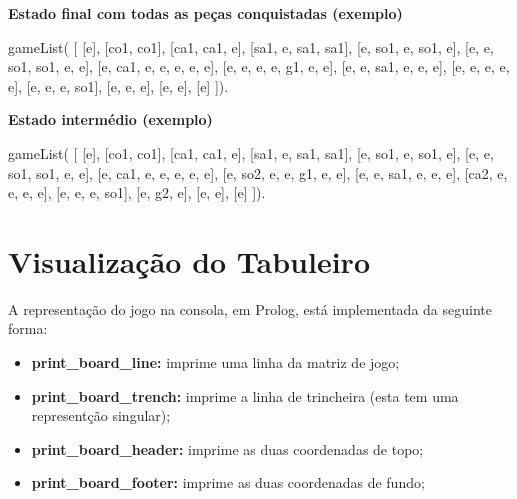 \vspace{1cm}

\textbf{Estado final com todas as peças conquistadas (exemplo)}

gameList( [ [e],
    [co1, co1],
    [ca1, ca1, e],
    [sa1, e, sa1, sa1],
    [e, so1, e, so1, e],
    [e, e, so1, so1, e, e],
    [e, ca1, e, e, e, e, e],
    [e, e, e, e, g1, e, e],
    [e, e, sa1, e, e, e],
    [e, e, e, e, e],
    [e, e, e, so1],
    [e, e, e],
    [e, e],
     [e]  ]).

\vspace{1cm}

\textbf{Estado intermédio (exemplo)}

gameList( [ [e],
    [co1, co1],
    [ca1, ca1, e],
    [sa1, e, sa1, sa1],
    [e, so1, e, so1, e],
    [e, e, so1, so1, e, e],
    [e, ca1, e, e, e, e, e],
    [e, so2, e, e, g1, e, e],
    [e, e, sa1, e, e, e],
    [ca2, e, e, e, e],
    [e, e, e, so1],
    [e, g2, e],
    [e, e],
     [e]  ]).


\newpage

\section{Visualização do Tabuleiro}

A representação do jogo na consola, em Prolog, está implementada da seguinte forma:

\begin{itemize}
  \item{\textbf{print\_board\_line:} imprime uma linha da matriz de jogo;}
  \item{\textbf{print\_board\_trench:} imprime a linha de trincheira (esta tem uma representção singular);}
  \item{\textbf{print\_board\_header:} imprime as duas coordenadas de topo;}
  \item{\textbf{print\_board\_footer:} imprime as duas coordenadas de fundo;}
\end{itemize}

\vspace{1cm}

